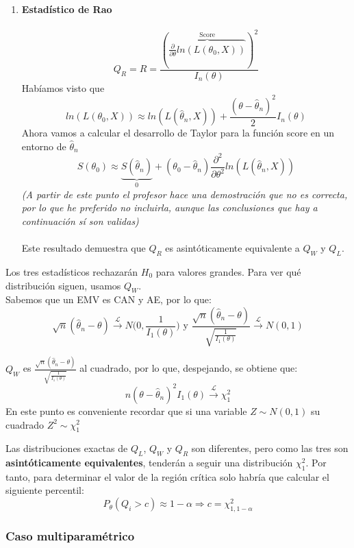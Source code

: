 \begin{enumerate}
    \newpage

    \item \textbf{Estadístico de Rao}\\\ \\
    $$Q_R=R=\frac{\left(\overbrace{\frac{\partial}{\partial\theta}ln(L(\theta_0,X))}^{\text{Score}}\right)^2}{I_n(\theta)}$$
    Habíamos visto que 
    $$ln(L(\theta_0,X))\approx ln(L(\widehat\theta_n,X))+\frac{(\theta-\widehat\theta_n)^2}{2}I_n(\theta)$$
    Ahora vamos a calcular el desarrollo de Taylor para la función score en un entorno de $\widehat\theta_n$
    $$S(\theta_0)\approx \underbrace{S(\widehat\theta_n)}_{0}+(\theta_0-\widehat\theta_n)\frac{\partial^2}{\partial\theta^2}ln(L(\widehat\theta_n,X))$$
    \textit{(A partir de este punto el profesor hace una demostración que no es correcta, por lo que he preferido no incluirla, aunque las conclusiones que hay a continuación sí son validas)}\\\ \\
    Este resultado demuestra que $Q_R$ es asintóticamente equivalente a $Q_W$ y $Q_L$. 
\end{enumerate}

Los tres estadísticos rechazarán $H_0$ para valores grandes. Para ver qué distribución siguen, usamos $Q_W$.\\
Sabemos que un EMV es CAN y AE, por lo que:
$$\sqrt{n}(\widehat\theta_n-\theta)\overset{\mathcal{L}}{\longrightarrow}N\Big(0,\frac{1}{I_1(\theta)}\Big)\text{ y }\frac{\sqrt{n}(\widehat\theta_n-\theta)}{\sqrt{\frac{1}{I_1(\theta)}}}\overset{\mathcal{L}}{\longrightarrow}N(0,1)$$

$Q_W$ es $\displaystyle\frac{\sqrt{n}(\widehat\theta_n-\theta)}{\sqrt{\frac{1}{I_1(\theta)}}}$ al cuadrado, por lo que, despejando, se obtiene que:
$$n(\theta-\widehat\theta_n)^2I_1(\theta)\overset{\mathcal{L}}{\longrightarrow}\chi^2_1$$
En este punto es conveniente recordar que si una variable $Z\sim N(0,1)$ su cuadrado $Z^2\sim \chi^2_1$

Las distribuciones exactas de $Q_L$, $Q_W$ y $Q_R$ son diferentes, pero como las tres son \textbf{asintóticamente equivalentes}, tenderán a seguir una distribución $\chi^2_1$. 
Por tanto, para determinar el valor de la región crítica solo habría que calcular el siguiente percentil:
$$P_{\theta}(Q_i>c)\approx 1-\alpha\Longrightarrow  c=\chi^2_{1,1-\alpha}$$

\subsubsection{Caso multiparamétrico}

